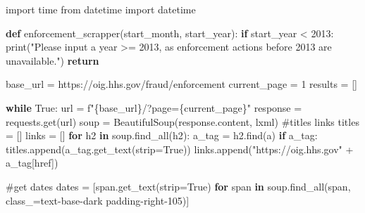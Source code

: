 \documentclass[
  letterpaper,
  DIV=11,
  numbers=noendperiod]{scrartcl}
\newenvironment{Shaded}{\begin{snugshade}}{\end{snugshade}}
\newcommand{\BuiltInTok}[1]{\textcolor[rgb]{0.00,0.23,0.31}{#1}}
\newcommand{\CommentTok}[1]{\textcolor[rgb]{0.37,0.37,0.37}{#1}}
\newcommand{\ControlFlowTok}[1]{\textcolor[rgb]{0.00,0.23,0.31}{\textbf{#1}}}
\newcommand{\DecValTok}[1]{\textcolor[rgb]{0.68,0.00,0.00}{#1}}
\newcommand{\ImportTok}[1]{\textcolor[rgb]{0.00,0.46,0.62}{#1}}
\newcommand{\KeywordTok}[1]{\textcolor[rgb]{0.00,0.23,0.31}{\textbf{#1}}}
\newcommand{\NormalTok}[1]{\textcolor[rgb]{0.00,0.23,0.31}{#1}}
\newcommand{\OperatorTok}[1]{\textcolor[rgb]{0.37,0.37,0.37}{#1}}
\newcommand{\SpecialCharTok}[1]{\textcolor[rgb]{0.37,0.37,0.37}{#1}}
\newcommand{\SpecialStringTok}[1]{\textcolor[rgb]{0.13,0.47,0.30}{#1}}
\newcommand{\StringTok}[1]{\textcolor[rgb]{0.13,0.47,0.30}{#1}}
\newcommand{\VariableTok}[1]{\textcolor[rgb]{0.07,0.07,0.07}{#1}}
\begin{document}
\begin{Shaded}
\begin{Highlighting}[]
\ImportTok{import}\NormalTok{ time}
\ImportTok{from}\NormalTok{ datetime }\ImportTok{import}\NormalTok{ datetime}

\KeywordTok{def}\NormalTok{ enforcement\_scrapper(start\_month, start\_year):}
    \ControlFlowTok{if}\NormalTok{ start\_year }\OperatorTok{\textless{}} \DecValTok{2013}\NormalTok{:}
        \BuiltInTok{print}\NormalTok{(}\StringTok{"Please input a year \textgreater{}= 2013, as enforcement actions before 2013 are unavailable."}\NormalTok{)}
        \ControlFlowTok{return}

\NormalTok{    base\_url }\OperatorTok{=} \StringTok{\textquotesingle{}https://oig.hhs.gov/fraud/enforcement\textquotesingle{}}
\NormalTok{    current\_page }\OperatorTok{=} \DecValTok{1}
\NormalTok{    results }\OperatorTok{=}\NormalTok{ []}

    \ControlFlowTok{while} \VariableTok{True}\NormalTok{:}
\NormalTok{        url }\OperatorTok{=} \SpecialStringTok{f"}\SpecialCharTok{\{}\NormalTok{base\_url}\SpecialCharTok{\}}\SpecialStringTok{/?page=}\SpecialCharTok{\{}\NormalTok{current\_page}\SpecialCharTok{\}}\SpecialStringTok{"}
\NormalTok{        response }\OperatorTok{=}\NormalTok{ requests.get(url)}
\NormalTok{        soup }\OperatorTok{=}\NormalTok{ BeautifulSoup(response.content, }\StringTok{\textquotesingle{}lxml\textquotesingle{}}\NormalTok{)}
\CommentTok{\#titles links}
\NormalTok{        titles }\OperatorTok{=}\NormalTok{ []}
\NormalTok{        links }\OperatorTok{=}\NormalTok{ []}
        \ControlFlowTok{for}\NormalTok{ h2 }\KeywordTok{in}\NormalTok{ soup.find\_all(}\StringTok{\textquotesingle{}h2\textquotesingle{}}\NormalTok{):}
\NormalTok{            a\_tag }\OperatorTok{=}\NormalTok{ h2.find(}\StringTok{\textquotesingle{}a\textquotesingle{}}\NormalTok{)}
            \ControlFlowTok{if}\NormalTok{ a\_tag:}
\NormalTok{                titles.append(a\_tag.get\_text(strip}\OperatorTok{=}\VariableTok{True}\NormalTok{))}
\NormalTok{                links.append(}\StringTok{"https://oig.hhs.gov"} \OperatorTok{+}\NormalTok{ a\_tag[}\StringTok{\textquotesingle{}href\textquotesingle{}}\NormalTok{])}

        \CommentTok{\#get dates}
\NormalTok{        dates }\OperatorTok{=}\NormalTok{ [span.get\_text(strip}\OperatorTok{=}\VariableTok{True}\NormalTok{) }\ControlFlowTok{for}\NormalTok{ span }\KeywordTok{in}\NormalTok{ soup.find\_all(}\StringTok{\textquotesingle{}span\textquotesingle{}}\NormalTok{, class\_}\OperatorTok{=}\StringTok{\textquotesingle{}text{-}base{-}dark padding{-}right{-}105\textquotesingle{}}\NormalTok{)]}


\end{Highlighting}
\end{Shaded}
\end{document}
